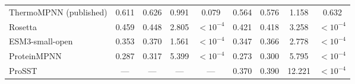 \begin{table}[H]
{\begin{tabular}{lcccccccc}
ThermoMPNN (published) & 0.611 & 0.626 & 0.991 & 0.079 & 0.564 & 0.576 & 1.158 & 0.632 \\
Rosetta & 0.459 & 0.448 & 2.805 & $<10^{-4}$ & 0.421 & 0.418 & 3.258 & $<10^{-4}$ \\
ESM3-small-open & 0.353 & 0.370 & 1.561 & $<10^{-4}$ & 0.347 & 0.366 & 2.778 & $<10^{-4}$ \\
ProteinMPNN & 0.287 & 0.317 & 5.399 & $<10^{-4}$ & 0.273 & 0.300 & 5.795 & $<10^{-4}$ \\
ProSST & --- & --- & --- & --- & 0.370 & 0.390 & 12.221 & $<10^{-4}$ \\
\bottomrule
\end{tabular}
}
\end{table}




